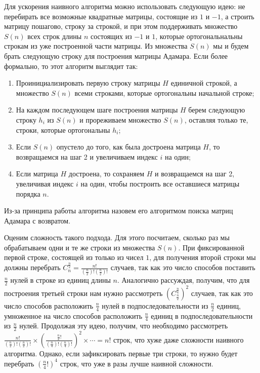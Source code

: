 Для ускорения наивного алгоритма можно использовать следующую идею: не перебирать все возможные квадратные матрицы, состоящие из $1$ и $-1$, а строить матрицу пошагово, строку за строкой, и при этом поддерживать множество $S(n)$ всех строк длины $n$ состоящих из $-1$ и $1$, которые ортогональнальны строкам из уже построенной части матрицы. Из множества $S(n)$ мы и будем брать следующую строку для построения матрицы Адамара. Если более формально, то этот алгоритм выглядит так:
\begin{enumerate}
    \item Проинициализировать первую строку матрицы $H$ единичной строкой, а множество $S(n)$ всеми строками, которые ортогональны начальной строке;
    \item На каждом последующем шаге построения матрицы $H$ берем следующую строку $h_i$ из $S(n)$ и прореживаем множество $S(n)$, оставляя только те, строки, которые ортогональны $h_i$;
    \item Если $S(n)$ опустело до того, как была достроена матрица $H$, то возвращаемся на шаг 2 и увеличиваем индекс $i$ на один;
    \item Если матрица $H$ достроена, то сохраняем $H$ и возвращаемся на шаг 2, увеличивая индекс $i$ на один, чтобы построить все оставшиеся матрицы порядка $n$.
\end{enumerate}

Из-за принципа работы алгоритма назовем его алгоритмом поиска матриц Адамара с возвратом.

Оценим сложность такого подхода. Для этого посчитаем, сколько раз мы обрабатываем одни и те же строки из множества $S(n)$. При фиксированной первой строке, состоящей из только из чисел $1$, для получения второй строки мы должны перебрать $C_n^\frac{n}{2} = \frac{n!}{\left(\frac{n}{2}\right)!\left(\frac{n}{2}\right)!}$ случаев, так как это число способов поставить $\frac{n}{2}$ нулей в строке из единиц длины $n$. Аналогично рассуждая, получим, что для построения третьей строки нам нужно рассмотреть $\left(C_\frac{n}{2}^\frac{n}{4}\right)^2$ случаев, так как это число способов расположить $\frac{n}{4}$ нулей в подпоследовательности из $\frac{n}{2}$ единиц, умноженное на число способов расположить $\frac{n}{4}$ единиц в подпоследовательности из $\frac{n}{2}$ нулей. Продолжая эту идею, получим, что необходимо рассмотреть $\frac{n!}{\left(\frac{n}{2}\right)!\left(\frac{n}{2}\right)!}\times\left(\frac{\frac{n}{2}!}{\left(\frac{n}{4}\right)!\left(\frac{n}{4}\right)!}\right)^2\times\cdots = n!$ строк, что хуже даже сложности наивного алгоритма. Однако, если зафиксировать первые три строки, то нужно будет перебрать $\left(\frac{n}{4}!\right)^4$ строк, что уже в разы лучше наивной сложности.

